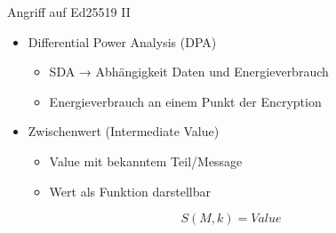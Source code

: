 \begin{frame}{Angriff auf Ed25519 II}
\protect\hypertarget{angriff-auf-ed25519-ii}{}
\begin{itemize}
\tightlist
\item
  Differential Power Analysis (DPA)

  \begin{itemize}
  \tightlist
  \item
    SDA → Abhängigkeit Daten und Energieverbrauch
  \item
    Energieverbrauch an einem Punkt der Encryption
  \end{itemize}
\end{itemize}

\pause

\begin{itemize}
\tightlist
\item
  Zwischenwert (Intermediate Value)

  \begin{itemize}
  \tightlist
  \item
    Value mit bekanntem Teil/Message
  \item
    Wert als Funktion darstellbar
  \end{itemize}
\end{itemize}

\pause

\[ S(M,k) = Value \]
\end{frame}

